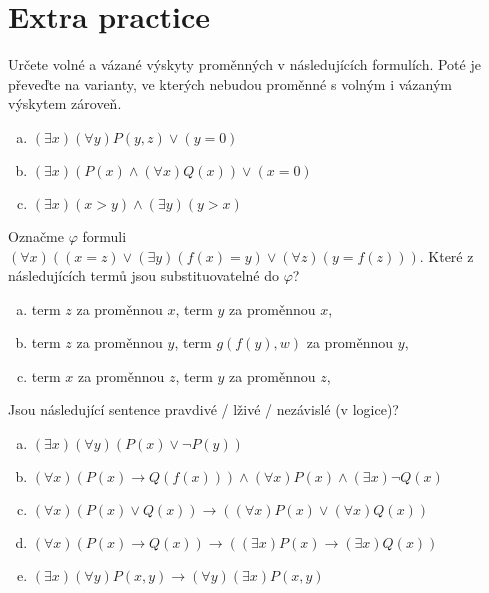         
\section*{Extra practice}


\begin{problem}

    Určete volné a vázané výskyty proměnných v následujících formulích. Poté je převeďte na varianty, ve kterých nebudou proměnné s volným i vázaným výskytem zároveň.
    \begin{enumerate}[(a)]
        \item $(\exists x)(\forall y)P(y,z) \vee (y=0)$
        \item $(\exists x)(P(x) \wedge (\forall x)Q(x)) \vee (x=0)$
        \item $(\exists x)(x>y) \wedge (\exists y)(y>x)$
    \end{enumerate}

\end{problem}


\begin{problem}
    
    Označme $\varphi$ formuli $(\forall x)((x=z) \vee (\exists y)(f(x)=y) \vee (\forall z)(y=f(z)))$. Které z následujících termů jsou substituovatelné do $\varphi$?
    \begin{enumerate}[(a)]
        \item term $z$ za proměnnou $x$, term $y$ za proměnnou $x$,
        \item term $z$ za proměnnou $y$, term $g(f(y),w)$ za proměnnou $y$,
        \item term $x$ za proměnnou $z$, term $y$ za proměnnou $z$,
    \end{enumerate}

\end{problem}


\begin{problem}

    Jsou následující sentence pravdivé / lživé / nezávislé (v logice)?

    \begin{enumerate}[(a)]
        \item $(\exists x)(\forall y)(P(x) \vee \neg P(y))$
        \item $(\forall x)(P(x)\to Q(f(x))) \wedge (\forall x)P(x) \wedge (\exists x)\neg Q(x)$
        \item $(\forall x)(P(x) \vee Q(x)) \to ((\forall x)P(x) \vee (\forall x)Q(x))$
        \item $(\forall x)(P(x)\to Q(x)) \to ((\exists x)P(x)\to(\exists x)Q(x))$
        \item $(\exists x)(\forall y)P(x,y) \to (\forall y)(\exists x)P(x,y)$
    \end{enumerate}

\end{problem}



